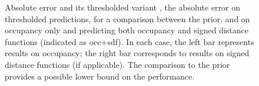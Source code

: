 \begin{figure}
  
  \caption{Absolute error \Abs and its thresholded variant \AbsThr, \ie
  the absolute error on thresholded predictions,
  for a comparison between the \VAE prior, \AML and \EVAE on occupancy only
  and \AML predicting both occupancy and signed distance functions (indicated as occ+sdf).
  In each case, the left bar represents results on occupancy; the right bar
  corresponds to results on signed distance functions (if applicable). The comparison
  to the \VAE prior provides a possible lower bound on the performance.}
  \label{fig:experiments-3d-aml-abs}
\end{figure}
